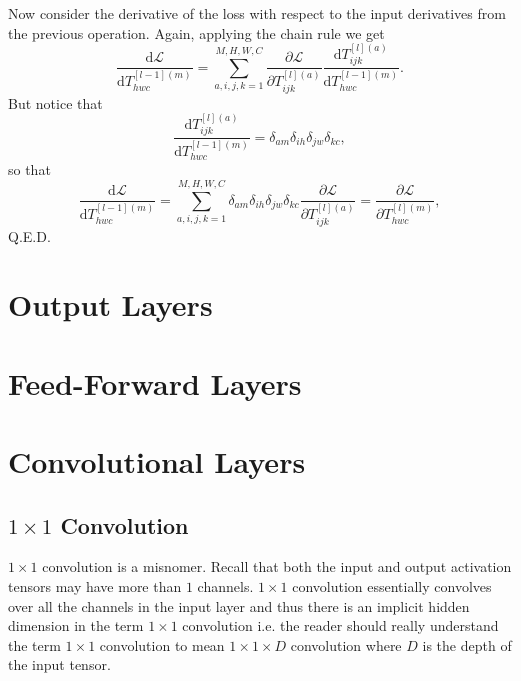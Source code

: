 \documentclass[modern]{aastex61}
\newcommand{\uderivative}{\mathrm{d}}
\begin{document}
Now consider the derivative of the loss with respect to the input derivatives from the previous operation. Again, applying the chain rule we get
\begin{equation*}
  \frac{\uderivative \mathscr{L}}{\uderivative T^{[l-1](m)}_{hwc}} = \sum_{a,i,j,k = 1}^{M,H,W,C} \frac{\partial \mathscr{L}}{\partial  T^{[l](a)}_{ijk}} \frac{\uderivative  T^{[l](a)}_{ijk}}{\uderivative T^{[l-1](m)}_{hwc}}.
\end{equation*}
But notice that
\begin{equation*}
  \frac{\uderivative  T^{[l](a)}_{ijk}}{\uderivative T^{[l-1](m)}_{hwc}} = \delta_{am}\delta_{ih}\delta_{jw}\delta_{kc},
\end{equation*}
so that
\begin{equation*}
  \frac{\uderivative \mathscr{L}}{\uderivative T^{[l-1](m)}_{hwc}} = \sum_{a,i,j,k = 1}^{M,H,W,C} \delta_{am}\delta_{ih}\delta_{jw}\delta_{kc} \frac{\partial \mathscr{L}}{\partial  T^{[l](a)}_{ijk}} = \frac{\partial \mathscr{L}}{\partial  T^{[l](m)}_{hwc}},
\end{equation*}
Q.E.D.

\section{Output Layers} \label{sec:out}

\section{Feed-Forward Layers} \label{sec:ff}

\section{Convolutional Layers} \label{sec:conv}

\subsection{$1 \times 1$ Convolution} \label{sec:conv11}

$1 \times 1$ convolution is a misnomer. Recall that both the input and output activation tensors may have more than $1$ channels. $1 \times 1$ convolution essentially convolves over all the channels in the input layer and thus there is an implicit hidden dimension in the term $1 \times 1$ convolution i.e. the reader should really understand the term $1 \times 1$ convolution to mean $1 \times 1 \times D$ convolution where $D$ is the depth of the input tensor.
\end{document}
